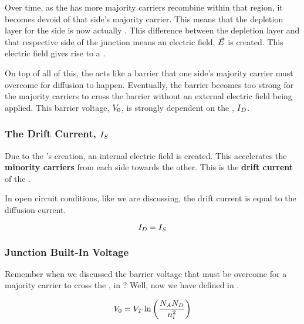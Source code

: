 Over time, as the  has more majority carriers recombine within that region, it becomes devoid of that side's majority carrier.
This means that the depletion layer for the \NType{} side is now actually \PType{}.
This difference between the depletion layer and that respective side of the junction means an electric field, $\vec{E}$ is created.
This electric field gives rise to a .

On top of all of this, the  acts like a barrier that one side's majority carrier must overcome for diffusion to happen.
Eventually, the barrier becomes too strong for the majority carriers to cross the barrier without an external electric field being applied.
This barrier voltage, $V_{0}{}$, is strongly dependent on the , $I_{D}$.

\subsubsection{The Drift Current, $I_{S}$}\label{subsubsec:pn_Junction-Drift_Current-No_V}
Due to the 's creation, an internal electric field is created.
This accelerates the \textbf{minority carriers} from each side towards the other.
This is the \textbf{drift current} of the \PNJunction{}.

In open circuit conditions, like we are discussing, the drift current is equal to the diffusion current.

\begin{equation*}
  I_{D} = I_{S}
\end{equation*}

\subsubsection{Junction Built-In Voltage}\label{subsubsec:pn_Junction_Built-In_Voltage}
Remember when we discussed the barrier voltage that must be overcome for a majority carrier to cross the , in ?
Well, now we have defined in .

\begin{equation}\label{eq:Junction_Built-In_Voltage}
  V_{0} = V_{T} \ln \left( \frac{N_{A} N_{D}}{n_{i}^{2}} \right)
\end{equation}

